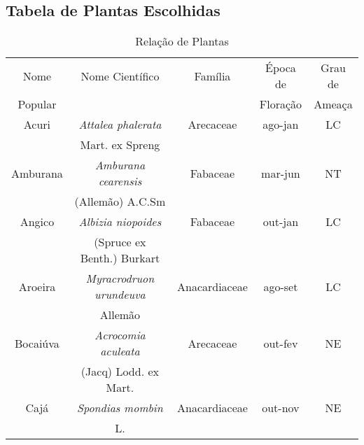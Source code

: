 \documentclass[
	12pt,				%
	oneside,			%
	a4paper,			%
	english,			%
	french,				%
	spanish,			%
	brazil				%
	]{configuracoes/tcc}
\begin{document}
\begin{anexosenv}

\partanexos

\chapter{Tabela de Plantas Escolhidas}

	\begin{table}[h]
		
		\caption{Relação de Plantas}
		\begin{tabular}{ccccc}
			\hline
			Nome		  	 & Nome Científico 				   			& Família 		& Época de 			 & Grau de			\\
			Popular			 & 											&				& Floração			& Ameaça			\\
			\hline                               %
			Acuri   		 & \textit{Attalea phalerata}	   			& Arecaceae 	& ago-jan 			& LC				\\
							 & Mart. ex Spreng				   			&				&				    &					\\
							
			Amburana		 & \textit{Amburana cearensis} 	   			& Fabaceae 		& mar-jun 			& NT				\\
							 & (Allemão) A.C.Sm				   			&				&				    &					\\
			
			Angico 			 & \textit{Albizia niopoides} 	   			& Fabaceae 		& out-jan 			& LC 				\\
							 & (Spruce ex Benth.) Burkart 	   			&				&					&					\\
								
			Aroeira 		 & \textit{Myracrodruon urundeuva} 			& Anacardiaceae	& ago-set 			& LC 				\\
							 &  Allemão									&				&				    &					\\
			
			Bocaiúva 		 & \textit{Acrocomia aculeata}      		& Arecaceae 	& out-fev 			& NE 				\\
							 &  (Jacq) Lodd. ex Mart.		    		&				&				    &					\\
			
			Cajá 			 & \textit{Spondias mombin}		    		& Anacardiaceae & out-nov 			& NE 				\\
							 & L. 						  	    		&				&				    &					\\
			

\end{tabular}
\end{table}
\end{anexosenv}
\end{document}
